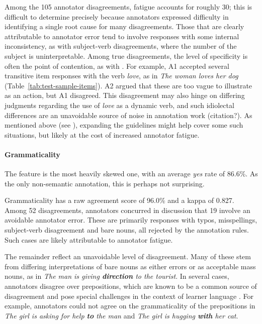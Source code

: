 Among the 105 annotator disagreements, fatigue accounts for roughly 30; this is difficult to determine precisely because annotators expressed difficulty in identifying a single root cause for many disagreements. Those that are clearly attributable to annotator error tend to involve responses with some internal inconsistency, as with subject-verb disagreements, where the number of the subject is uninterpretable. Among true disagreements, the level of specificity is often the point of contention, as with . For example, A1 accepted several transitive item responses with the verb \textit{love}, as in \textit{The woman loves her dog} (Table~\ref{tab:test-sample-items}). A2 argued that these are too vague to illustrate as an action, but A1 disagreed. This disagreement may also hinge on differing judgments regarding the use of \textit{love} as a dynamic verb, and such idiolectal differences are an unavoidable source of noise in annotation work (citation?). As mentioned above (see ), expanding the guidelines might help cover some such situations, but likely at the cost of increased annotator fatigue.

\paragraph{Grammaticality} The  feature is the most heavily skewed one, with an average \textit{yes} rate of 86.6\%.  As the only non-semantic annotation, this is perhaps not surprising.

Grammaticality has a raw agreement score of 96.0\% and a kappa of 0.827. Among 52 disagreements, annotators concurred in discussion that 19 involve an avoidable annotator error. These are primarily responses with typos, misspellings, subject-verb disagreement and bare nouns, all rejected by the annotation rules. Such cases are likely attributable to annotator fatigue.

The remainder reflect an unavoidable level of disagreement. Many of these stem from differing interpretations of bare nouns as either errors or as acceptable mass nouns, as in \textit{The man is giving \textbf{direction} to the tourist}. In several cases, annotators disagree over prepositions, which are known to be a common source of disagreement and pose special challenges in the context of learner language \citep{tetreault-chodorow:2008:HJCL,tetreault:chodorow:08}. For example, annotators could not agree on the grammaticality of the prepositions in \textit{The girl is asking for help \textbf{to} the man} and \textit{The girl is hugging \textbf{with} her cat}. 

